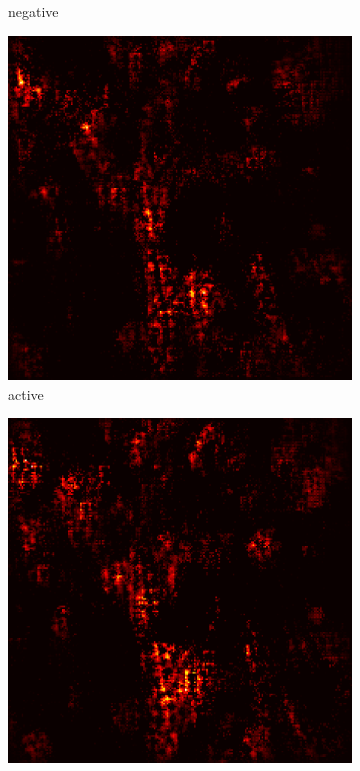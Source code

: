 \documentclass[preprint,12pt]{elsarticle}
\begin{document}
\begin{figure}
\begin{subfigure}{0.14\textwidth}
        \caption{negative}
    \end{subfigure}
    \hfill
    \begin{subfigure}{0.14\textwidth}
        \centering
        \includegraphics[width=\linewidth]{../visualizations/examples/imagenette/cnn/active_saliency_map/6.png}
        \caption{active}
    \end{subfigure}
    \hfill
    \begin{subfigure}{0.14\textwidth}
        \centering
        \includegraphics[width=\linewidth]{../visualizations/examples/imagenette/cnn/inactive_saliency_map/6.png}

\end{subfigure}
\end{figure}
\end{document}
